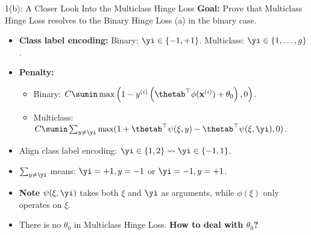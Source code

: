 \documentclass[aspectratio=169]{beamer}
\begin{document}
\begin{frame}{1(b): A Closer Look Into the Multiclass Hinge Loss}
\small
\textbf{Goal:} Prove that Multiclass Hinge Loss resolves to the Binary Hinge Loss (a) in the binary case.
	\begin{itemize}
		\item<1-> \textbf{Class label encoding:} Binary: $\yi \in \{-1, +1\}$. Multiclass: $\yi \in \{1, \ldots, g\}$.
		\item<2-> \textbf{Penalty:} 
			\begin{itemize}
				\item Binary: $C \sumin \max\left(1 - y^{(i)} \left(\thetab^\top \phi(\mathbf{x}^{(i)}) + \theta_0 \right), 0 \right)$.
				\item Multiclass: $C \sumin \sum_{y\neq \yi} \max (1 + \thetab^\top \psi (\xi, y) - \thetab^\top \psi(\xi, \yi), 0)$.
			\end{itemize}
		\item<3-> Align class label encoding: $\yi \in \{1, 2\} \leadsto \yi \in \{-1, 1 \}$.
		\item<4-> $\sum_{y \neq \yi}$ means: $\yi = +1, y = -1$ or $\yi = -1, y = +1$.
		\item<5-> \textbf{Note} $\psi(\xi, \yi)$ takes both $\xi$ and $\yi$ as arguments, while $\phi(\xi)$ only operates on $\xi$.
		\item<6-> There is no $\theta_0$ in Multiclass Hinge Loss. \textbf{How to deal with $\theta_0$?} 
	\end{itemize}
	
\end{frame}
\end{document}
